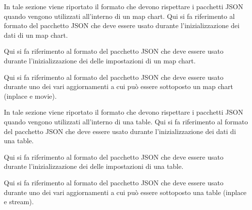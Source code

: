         In tale sezione viene riportato il formato che devono rispettare i pacchetti JSON quando vengono utilizzati all'interno di un map chart.
            Qui si fa riferimento al formato del pacchetto JSON che deve essere usato durante l'inizializzazione dei dati di un map chart.
            
            Qui si fa riferimento al formato del pacchetto JSON che deve essere usato durante l'inizializzazione dei delle impostazioni di un map chart.
            
            Qui si fa riferimento al formato del pacchetto JSON che deve essere usato durante uno dei vari aggiornamenti a cui può essere sottoposto un map chart (inplace e movie).
                
                

        In tale sezione viene riportato il formato che devono rispettare i pacchetti JSON quando vengono utilizzati all'interno di una table.
            Qui si fa riferimento al formato del pacchetto JSON che deve essere usato durante l'inizializzazione dei dati di una table.
            
            Qui si fa riferimento al formato del pacchetto JSON che deve essere usato durante l'inizializzazione dei delle impostazioni di una table.
            
            Qui si fa riferimento al formato del pacchetto JSON che deve essere usato durante uno dei vari aggiornamenti a cui può essere sottoposto una table (inplace e stream).
                
                